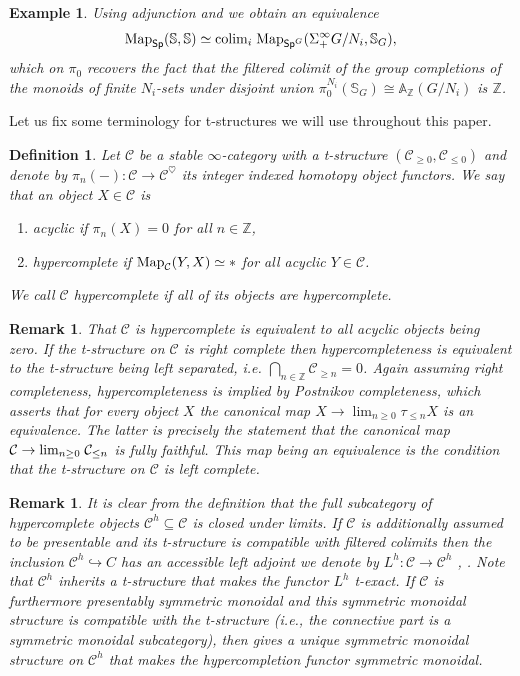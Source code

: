 \documentclass[reqno]{amsart}
\numberwithin{equation}{section}\theoremstyle{thms}
\theoremstyle{defn}
\newtheorem{defi}[equation]{Definition}
\newtheorem{ex}[equation]{Example}
\newtheorem{rem}[equation]{Remark}
\newcommand{\bA}{\mathbb{A}}
\newcommand{\bS}{\mathbb{S}}
\newcommand{\bZ}{\mathbb{Z}}
\newcommand{\cC}{\mathcal{C}}
\newcommand{\tn}[1]{\textnormal{#1}}
\newcommand{\tsf}[1]{\textsf{\textup{#1}}}
\newcommand{\Map}{\tn{Map}}
\newcommand{\spec}{\tsf{Sp}}
\newcommand{\specg}{\tsf{Sp}^G}
\begin{document}
\begin{ex}
Using adjunction and  we obtain an equivalence
$$\Map_{\spec}(\bS,\bS) \simeq \tn{colim}_i \; \Map_{\specg}(\Sigma^{\infty}_+ G/N_i,\bS_G),$$
which on $\pi_0$ recovers the fact that the filtered colimit of the group completions of the monoids of finite $N_i$-sets under disjoint union $\pi_0^{N_i}(\bS_G) \cong \bA_{\bZ}(G/N_i)$ is $\bZ$.
\end{ex}

Let us fix some terminology for t-structures we will use throughout this paper.

\begin{defi}\label{def:hypercompletetstructure}
Let $\cC$ be a stable $\infty$-category with a t-structure $(\cC_{\geq 0},\cC_{\leq 0})$ and denote by $\pi_n(-): \cC \to \cC^{\heartsuit}$ its integer indexed homotopy object functors. We say that an object $X \in \cC$ is
\begin{enumerate}
    \item \emph{acyclic} if $\pi_n(X) = 0$ for all $n \in \bZ$,
    \item \emph{hypercomplete} if $\Map_{\cC}(Y,X) \simeq \ast$ for all acyclic $Y \in \cC$.
\end{enumerate}
We call $\cC$ \emph{hypercomplete} if all of its objects are hypercomplete. 
\end{defi}

\begin{rem}
That $\cC$ is hypercomplete is equivalent to all acyclic objects being zero. If the t-structure on $\cC$ is right complete then hypercompleteness is equivalent to the t-structure being left separated, i.e. $\bigcap_{n \in \bZ} \cC_{\geq n} = 0$. Again assuming right completeness, hypercompleteness is implied by Postnikov completeness, which asserts that for every object $X$ the canonical map $X \to \lim_{n\geq 0} \tau_{\leq n} X$ is an equivalence. The latter is precisely the statement that the canonical map $\cC \to \tn{lim}_{n \geq 0} \; \cC_{\leq n}$ is fully faithful. This map being an equivalence is the condition that the t-structure on $\cC$ is left complete.
\end{rem}

\begin{rem}
It is clear from the definition that the full subcategory of hypercomplete objects $\cC^h \subseteq \cC$ is closed under limits. If $\cC$ is additionally assumed to be presentable and its t-structure is compatible with filtered colimits then the inclusion $\cC^h \hookrightarrow C$ has an accessible left adjoint we denote by $L^h: \cC \to \cC^h$ \cite[Proposition 2.14]{cm21}, \cite[Proposition C.1.4.1]{lur18}. Note that $\cC^h$ inherits a t-structure that makes the functor $L^h$ t-exact. If $\cC$ is furthermore presentably symmetric monoidal and this symmetric monoidal structure is compatible with the t-structure (i.e., the connective part is a symmetric monoidal subcategory), then \cite[Lemma 2.22]{cm21} gives a unique symmetric monoidal structure on $\cC^h$ that makes the hypercompletion functor symmetric monoidal.
\end{rem}
\end{document}
